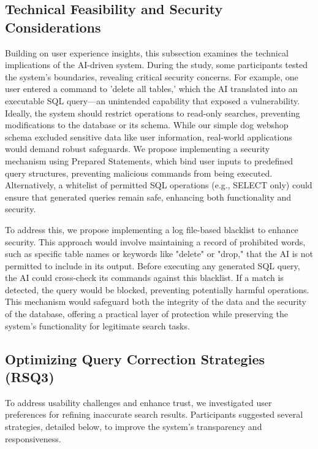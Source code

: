 \documentclass[../../submission.tex]{subfiles}
\begin{document}
 \subsection{Technical Feasibility and Security Considerations}
 Building on user experience insights, this subsection examines the technical implications 
 of the AI-driven system. During the study, some participants tested the system’s boundaries, 
 revealing critical security concerns. For example, one user entered a command to 'delete 
 all tables,' which the AI translated into an executable SQL query—an unintended capability 
 that exposed a vulnerability. Ideally, the system should restrict operations to read-only 
 searches, preventing modifications to the database or its schema. While our simple dog 
 webshop schema excluded sensitive data like user information, real-world applications 
 would demand robust safeguards. We propose implementing a security mechanism using 
 Prepared Statements, which bind user inputs to predefined query structures, preventing 
 malicious commands from being executed. Alternatively, a whitelist of permitted SQL 
 operations (e.g., SELECT only) could ensure that generated queries remain safe, enhancing 
 both functionality and security. 

 To address this, we propose implementing a log file-based blacklist to enhance security. 
 This approach would involve maintaining a record of prohibited words, such as specific 
 table names or keywords like "delete" or "drop," that the AI is not permitted to include 
 in its output. Before executing any generated SQL query, the AI could cross-check its 
 commands against this blacklist. If a match is detected, the query would be blocked, 
 preventing potentially harmful operations. This mechanism would safeguard both the 
 integrity of the data and the security of the database, offering a practical layer 
 of protection while preserving the system’s functionality for legitimate search tasks.
 
 \subsection{Optimizing Query Correction Strategies (RSQ3)}
 To address usability challenges and enhance trust, we investigated user preferences 
 for refining inaccurate search results. Participants suggested several strategies, 
 detailed below, to improve the system’s transparency and responsiveness.
\end{document}
